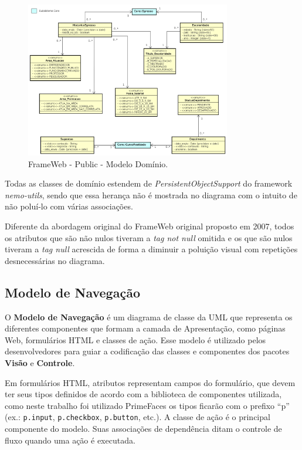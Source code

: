 \begin{figure}[!h]
	\centering
	\includegraphics[width=0.8\textwidth]{figuras/projeto/fig-projeto-public-modelo-dominio}
	\caption{FrameWeb - Public - Modelo Domínio.}
	\label{fig-projeto-public-modelo-dominio}
\end{figure}

Todas as classes de domínio estendem de \textit{PersistentObjectSupport} do framework \textit{nemo-utils}, sendo que essa herança não é mostrada no diagrama com o intuito de não poluí-lo com várias associações.

Diferente da abordagem original do FrameWeb original proposto em 2007, todos os atributos que são não nulos tiveram a \textit{tag {not null}} omitida e os que são nulos tiveram a \textit{tag {null}} acrescida de forma a diminuir a poluição visual com repetições desnecessárias no diagrama.





\newpage
\subsection{Modelo de Navegação}

O \textbf{Modelo de Navegação} é um diagrama de classe da UML que representa os diferentes componentes que formam a camada de Apresentação, como páginas Web, formulários HTML e classes de ação. Esse modelo é utilizado pelos desenvolvedores para guiar a codificação das classes e componentes dos pacotes \textbf{Visão} e \textbf{Controle}.


Em formulários HTML, atributos representam campos do formulário, que devem ter seus tipos definidos de acordo com a biblioteca de componentes utilizada, como neste trabalho foi utilizado PrimeFaces os tipos ficarão com o prefixo ``p'' (ex.: \texttt{p.input}, \texttt{p.checkbox}, \texttt{p.button}, etc.). A classe de ação é o principal componente do modelo. Suas associações de dependência ditam o controle de fluxo quando uma ação é executada.



